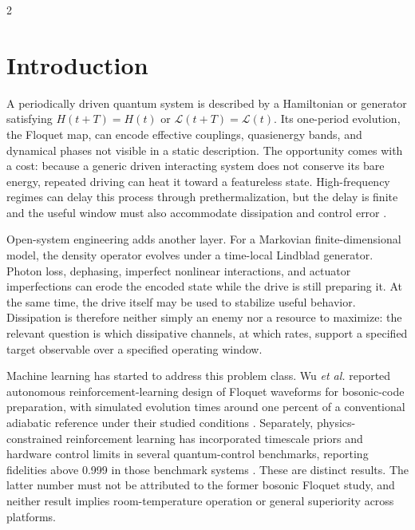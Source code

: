 \documentclass[10pt,twoside]{article}
\newcommand{\Lind}{\mathcal L}
\begin{document}
\vspace{5mm}
\begin{multicols}{2}
\small
\tableofcontents
\end{multicols}
\clearpage
{}

\section{Introduction}

A periodically driven quantum system is described by a Hamiltonian or generator satisfying $H(t+T)=H(t)$ or $\Lind(t+T)=\Lind(t)$. Its one-period evolution, the Floquet map, can encode effective couplings, quasienergy bands, and dynamical phases not visible in a static description. The opportunity comes with a cost: because a generic driven interacting system does not conserve its bare energy, repeated driving can heat it toward a featureless state. High-frequency regimes can delay this process through prethermalization, but the delay is finite and the useful window must also accommodate dissipation and control error \citep{abanin2017effective,ho2023floquetprethermal}.

Open-system engineering adds another layer. For a Markovian finite-dimensional model, the density operator evolves under a time-local Lindblad generator. Photon loss, dephasing, imperfect nonlinear interactions, and actuator imperfections can erode the encoded state while the drive is still preparing it. At the same time, the drive itself may be used to stabilize useful behavior. Dissipation is therefore neither simply an enemy nor a resource to maximize: the relevant question is which dissipative channels, at which rates, support a specified target observable over a specified operating window.

Machine learning has started to address this problem class. Wu \emph{et al.} reported autonomous reinforcement-learning design of Floquet waveforms for bosonic-code preparation, with simulated evolution times around one percent of a conventional adiabatic reference under their studied conditions \citep{wu2026autonomous}. Separately, physics-constrained reinforcement learning has incorporated timescale priors and hardware control limits in several quantum-control benchmarks, reporting fidelities above 0.999 in those benchmark systems \citep{ernst2025physicsconstraints}. These are distinct results. The latter number must not be attributed to the former bosonic Floquet study, and neither result implies room-temperature operation or general superiority across platforms.
\end{document}
